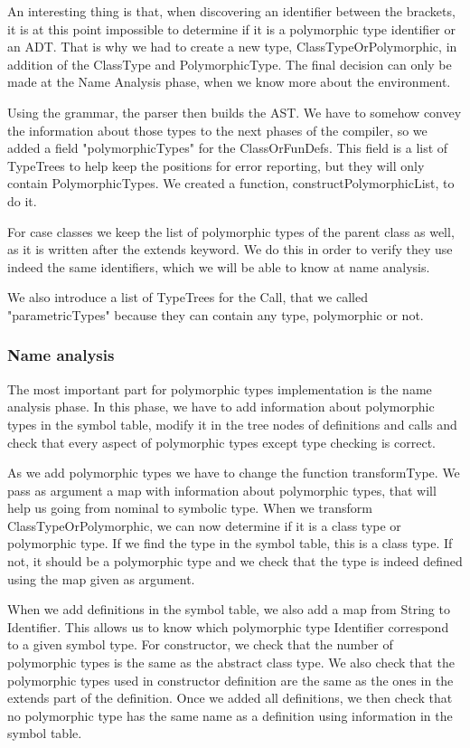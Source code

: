 An interesting thing is that, when discovering an identifier between the brackets, it is at this point impossible to determine if it is a polymorphic type identifier or an ADT. That is why we had to create a new type, ClassTypeOrPolymorphic, in addition of the ClassType and PolymorphicType. The final decision can only be made at the Name Analysis phase, when we know more about the environment.

Using the grammar, the parser then builds the AST. We have to somehow convey the information about those types to the next phases of the compiler, so we added a field "polymorphicTypes" for the ClassOrFunDefs. This field is a list of TypeTrees to help keep the positions for error reporting, but they will only contain PolymorphicTypes. We created a function, constructPolymorphicList, to do it.

For case classes we keep the list of polymorphic types of the parent class as well, as it is written after the extends keyword. We do this in order to verify they use indeed the same identifiers, which we will be able to know at name analysis.

We also introduce a list of TypeTrees for the Call, that we called "parametricTypes" because they can contain any type, polymorphic or not.

\subsubsection{Name analysis}
The most important part for polymorphic types implementation is the name analysis phase. In this phase, we have to add information about polymorphic types in the symbol table, modify it in the tree nodes of definitions and calls and check that every aspect of polymorphic types except type checking is correct.

As we add polymorphic types we have to change the function transformType. We pass as argument a map with information about polymorphic types, that will help us going from nominal to symbolic type. When we transform ClassTypeOrPolymorphic, we can now determine if it is a class type or polymorphic type. If we find the type in the symbol table, this is a class type. If not, it should be a polymorphic type and we check that the type is indeed defined using the map given as argument.

When we add definitions in the symbol table, we also add a map from String to Identifier. This allows us to know which polymorphic type Identifier correspond to a given symbol type. For constructor, we check that the number of polymorphic types is the same as the abstract class type. We also check that the polymorphic types used in constructor definition are the same as the ones in the extends part of the definition. Once we added all definitions, we then check that no polymorphic type has the same name as a definition using information in the symbol table.

